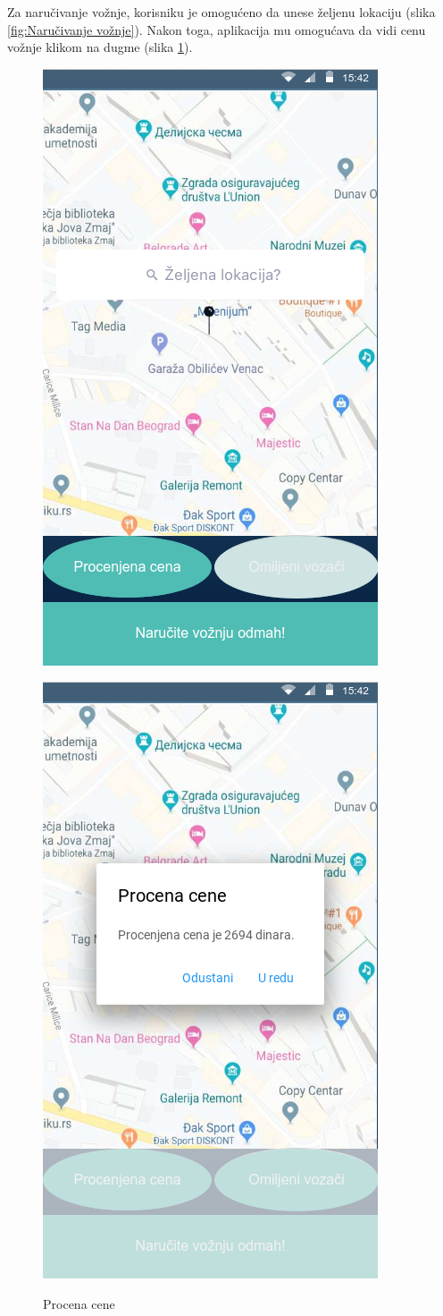 Za naručivanje vožnje, korisniku je omogućeno da unese željenu lokaciju (slika \ref{fig:Naručivanje vožnje}). Nakon toga, aplikacija mu omogućava da vidi cenu vožnje klikom na dugme  (slika \ref{fig:Procena cene}).


\begin{figure}[H]
\centering
\begin{minipage}{.5\textwidth}
  \centering
  \includegraphics[width=.4\linewidth]{Slike/Narucivanje_sa_adresom.png}
  \caption{Naručivanje vožnje}{}
  \label{fig:Naručivanje vožnje}
\end{minipage}%
\begin{minipage}{.5\textwidth}
  \centering
  \includegraphics[width=.4\linewidth]{Slike/Procena_cene.png}
   \caption{Procena cene}{}
  \label{fig:Procena cene}
\end{minipage}
\end{figure}

